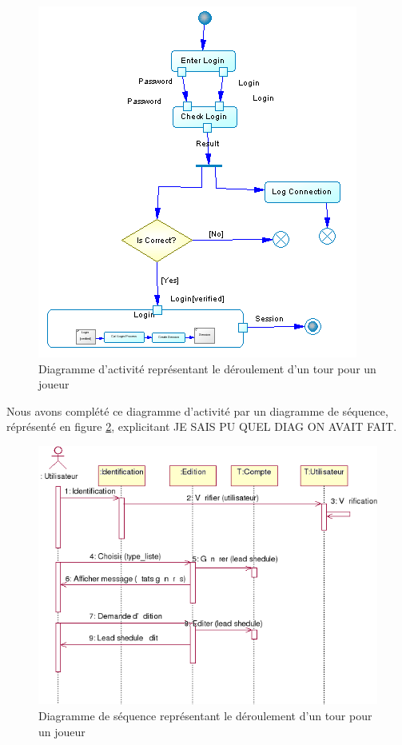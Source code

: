 \documentclass[12pt]{article}
\begin{document}
\begin{figure}[!h] 
\centerline{\includegraphics[scale=0.60]{img/activite_jeu_ex.png}}
   \caption{\label{étiquette} Diagramme d'activité représentant le déroulement d'un tour pour un joueur}
\label{activiteJeu}
\end{figure}

Nous avons complété ce diagramme d'activité par un diagramme de séquence, réprésenté en figure \ref{sequenceJeu}, explicitant JE SAIS PU QUEL DIAG ON AVAIT FAIT.

\begin{figure}[!h] 
\centerline{\includegraphics[scale=0.60]{img/sequence_jeu_ex.png}}
   \caption{\label{étiquette} Diagramme de séquence représentant le déroulement d'un tour pour un joueur}
\label{sequenceJeu}
\end{figure}
\end{document}
